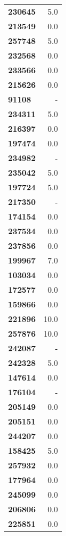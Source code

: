 \documentclass[11pt]{article}
\begin{document}
\begin{center}
\begin{longtable}{lr}
\bottomrule
\endlastfoot
\textbf{230645} &                        5.0 \\
\textbf{213549} &                        0.0 \\
\textbf{257748} &                        5.0 \\
\textbf{232568} &                        0.0 \\
\textbf{233566} &                        0.0 \\
\textbf{215626} &                        0.0 \\
\textbf{91108 } &                          - \\
\textbf{234311} &                        5.0 \\
\textbf{216397} &                        0.0 \\
\textbf{197474} &                        0.0 \\
\textbf{234982} &                          - \\
\textbf{235042} &                        5.0 \\
\textbf{197724} &                        5.0 \\
\textbf{217350} &                          - \\
\textbf{174154} &                        0.0 \\
\textbf{237534} &                        0.0 \\
\textbf{237856} &                        0.0 \\
\textbf{199967} &                        7.0 \\
\textbf{103034} &                        0.0 \\
\textbf{172577} &                        0.0 \\
\textbf{159866} &                        0.0 \\
\textbf{221896} &                       10.0 \\
\textbf{257876} &                       10.0 \\
\textbf{242087} &                          - \\
\textbf{242328} &                        5.0 \\
\textbf{147614} &                        0.0 \\
\textbf{176104} &                          - \\
\textbf{205149} &                        0.0 \\
\textbf{205151} &                        0.0 \\
\textbf{244207} &                        0.0 \\
\textbf{158425} &                        5.0 \\
\textbf{257932} &                        0.0 \\
\textbf{177964} &                        0.0 \\
\textbf{245099} &                        0.0 \\
\textbf{206806} &                        0.0 \\
\textbf{225851} &                        0.0 \\
\end{longtable}
\end{center}
\end{document}
